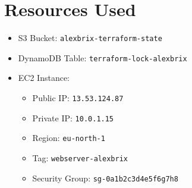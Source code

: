 \documentclass{article}
\begin{document}
\section{Resources Used}
\begin{itemize}
  \item S3 Bucket: \texttt{alexbrix-terraform-state}
  \item DynamoDB Table: \texttt{terraform-lock-alexbrix}
  \item EC2 Instance:
    \begin{itemize}
      \item Public IP: \texttt{13.53.124.87}
      \item Private IP: \texttt{10.0.1.15}
      \item Region: \texttt{eu-north-1}
      \item Tag: \texttt{webserver-alexbrix}
      \item Security Group: \texttt{sg-0a1b2c3d4e5f6g7h8}
    \end{itemize}
\end{itemize}
\end{document}
